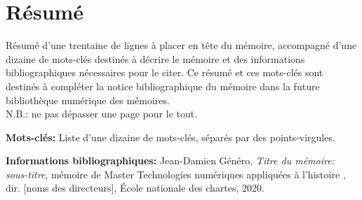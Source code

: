 \section*{Résumé}

 Résumé d'une trentaine de lignes à placer en tête du mémoire, accompagné d'une dizaine de mots-clés destinés à décrire le mémoire et des informations bibliographiques nécessaires pour le citer. Ce résumé et ces mots-clés sont destinés à compléter la notice bibliographique du mémoire dans la future bibliothèque numérique des mémoires.\\
N.B.: ne pas dépasser une page pour le tout.

\medskip

\textbf{Mots-clés:} Liste d'une dizaine de mots-clés, séparés par des points-virgules.

\textbf{Informations bibliographiques:} Jean-Damien Généro, \textit{Titre du mémoire: sous-titre}, mémoire de Master \og Technologies numériques appliquées à l'histoire \fg{}, dir. [noms des directeurs], École nationale des chartes, 2020.
